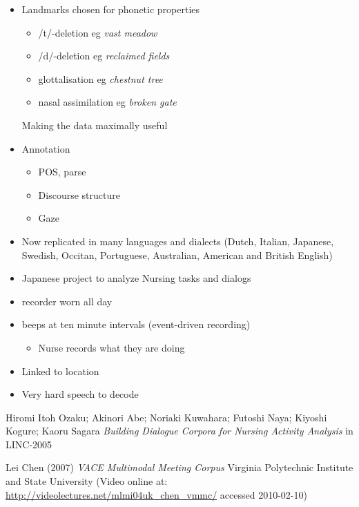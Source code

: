 \documentclass[a4paper,landscape,headrule,footrule,dvips]{foils}
\begin{document}
\begin{CJK}{UTF8}{min}
\begin{itemize}
\item Landmarks chosen for phonetic properties
  \begin{itemize}
\item /t/-deletion eg \textit{vast meadow}
\item /d/-deletion eg \textit{reclaimed fields}
\item glottalisation eg \textit{chestnut tree}
\item nasal assimilation eg \textit{broken gate }
\end{itemize}
Making the data maximally useful
\item Annotation
  \begin{itemize}
  \item POS, parse
  \item Discourse structure
  \item Gaze
  \end{itemize}
\item Now replicated in many languages and dialects (Dutch, Italian, Japanese, Swedish, Occitan, Portuguese, Australian, American and British English)
\end{itemize}

\begin{itemize}
\item Japanese project to analyze Nursing tasks and dialogs
\item recorder worn all day
\item beeps at ten minute intervals  (event-driven recording)
  \begin{itemize}
  \item Nurse records what they are doing
  \end{itemize}
\item Linked to location
\item Very hard speech to decode
\end{itemize}
Hiromi Itoh Ozaku; Akinori Abe; Noriaki Kuwahara; Futoshi Naya; Kiyoshi Kogure; Kaoru Sagara
\textit{Building Dialogue Corpora for Nursing Activity Analysis} in LINC-2005





Lei Chen (2007) \textit{VACE Multimodal Meeting Corpus} Virginia
Polytechnic Institute and State University (Video online at:
\url{http://videolectures.net/mlmi04uk_chen_vmmc/} accessed
2010-02-10)


\end{CJK}
\end{document}
